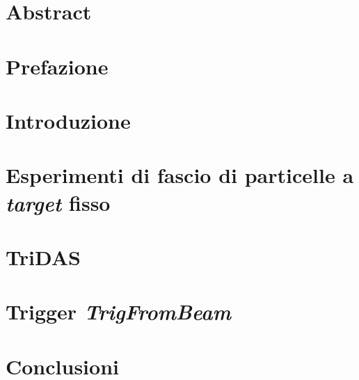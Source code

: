 \documentclass[12pt, a4paper, twoside]{report}
\begin{document}
\begin{titlepage}
    
\end{titlepage}
\setcounter{page}{1}
\chapter*{Abstract}

\chapter*{Prefazione}

\tableofcontents{}
\newpage
\chapter*{Introduzione}

\chapter{Esperimenti di fascio di particelle a \emph{target} fisso}

\chapter{TriDAS}

\chapter{Trigger \emph{TrigFromBeam}}

\chapter*{Conclusioni}

\nocite{*}
\printbibliography
{}
\end{document}
